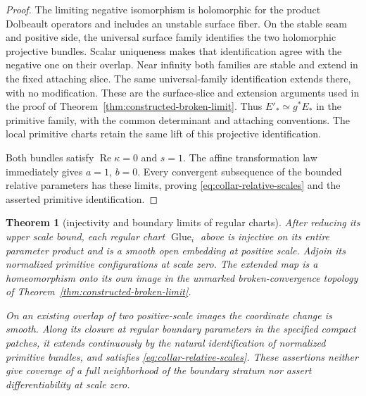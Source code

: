 \documentclass[11pt]{amsart}
\newtheorem{theorem}{Theorem}[section]
\theoremstyle{definition}
\theoremstyle{remark}
\theoremstyle{plain}
\newcommand{\Glue}{\operatorname{Glue}}
\begin{document}
\begin{proof}
The limiting negative isomorphism is holomorphic for
the product Dolbeault operators and includes an unstable
surface fiber. On the stable seam and positive side,
the universal surface family identifies the two
holomorphic projective bundles. Scalar uniqueness
makes that identification agree with the negative one
on their overlap. Near infinity both families are
stable and extend in the fixed attaching slice.
The same universal-family identification extends there,
with no modification. These are the surface-slice and
extension arguments used in the proof of
Theorem~\ref{thm:constructed-broken-limit}.
Thus $E'_*\simeq g^*E_*$ in the primitive family,
with the common determinant and attaching conventions.
The local primitive charts retain the same lift of
this projective identification.

Both bundles satisfy $\operatorname{Re}\kappa=0$ and
$s=1$. The affine transformation law immediately gives
$a=1$, $b=0$. Every convergent subsequence of the
bounded relative parameters has these limits, proving
\eqref{eq:collar-relative-scales} and the asserted
primitive identification.
\end{proof}

\begin{theorem}[injectivity and boundary limits of regular charts]
\label{thm:regular-chart-compatibility}
After reducing its upper scale bound, each regular chart
$\Glue_i$ above is injective on its entire parameter
product and is a smooth open embedding at positive scale.
Adjoin its normalized primitive configurations at scale
zero. The extended map is a homeomorphism onto its own
image in the unmarked broken-convergence topology of
Theorem~\ref{thm:constructed-broken-limit}.

On an existing overlap of two positive-scale images
the coordinate change is smooth. Along its closure
at regular boundary parameters in the specified compact
patches, it extends continuously by the natural
identification of normalized primitive bundles, and
satisfies \eqref{eq:collar-relative-scales}.
These assertions neither give coverage of a full
neighborhood of the boundary stratum nor assert
differentiability at scale zero.
\end{theorem}
\end{document}
